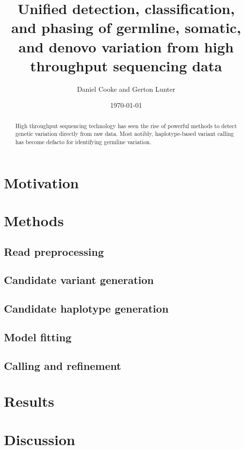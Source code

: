 \documentclass[notitlepage]{report}
\title{Unified detection, classification, and phasing of germline, somatic, and denovo variation from high throughput sequencing data}
\author{Daniel Cooke and Gerton Lunter}
\date{\today}
\begin{document}
\maketitle
\thispagestyle{empty}

\begin{abstract}
High throughput sequencing technology has seen the rise of powerful methods to detect genetic variation directly from raw data. Most notibly, haplotype-based variant calling has become defacto for identifying germline variation. 
\end{abstract}

\section*{Motivation}

\section*{Methods}

\subsection{Read preprocessing}

\subsection{Candidate variant generation}

\subsection{Candidate haplotype generation}

\subsection{Model fitting}

\subsection{Calling and refinement}

\section*{Results}

\section*{Discussion}
\end{document}

